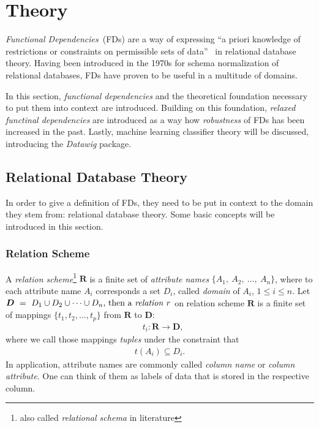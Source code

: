 \newpage
\section{Theory}
\emph{Functional Dependencies}~(FDs) are a way of expressing ``a priori knowledge of restrictions or constraints on permissible sets of data''~\cite[p.~42]{MAI83} in relational database theory.
Having been introduced in the 1970s for schema normalization of relational databases, FDs have proven to be useful in a multitude of domains.

In this section, \emph{functional dependencies} and the theoretical foundation necessary to put them into context are introduced.
Building on this foundation, \emph{relaxed functinal dependencies} are introduced as a way how \emph{robustness} of FDs has been increased in the past.
Lastly, machine learning classifier theory will be discussed, introducing the \emph{Datawig} package.

\subsection{Relational Database Theory}
In order to give a definition of FDs, they need to be put in context to the domain they stem from: relational database theory. Some basic concepts will be introduced in this section.

\subsubsection{Relation Scheme}
A \emph{relation scheme}\footnote{also called \emph{relational schema} in literature\cite[p.21]{ABE19} } \(\boldsymbol{R}\) is a finite set of \emph{attribute names} \(\{A_1,~A_2,~\dots,~A_n\}\), where to each attribute name \(A_i\) corresponds a set \(D_i\), called \emph{domain} of \(A_i\), \(1 \leq i \leq n\).
Let \(\boldsymbol{D}~=~D_1 \cup D_2 \cup \dots \cup D_n$, then a \emph{relation} \(r\) on relation scheme \(\boldsymbol{R}\) is a finite set of mappings \(\{t_1, t_2, \dots, t_p\}\) from \(\boldsymbol{R}\) to \(\boldsymbol{D}\):
\begin{align*}
  &t_i: \boldsymbol{R} \to \boldsymbol{D},
\end{align*}
where we call those mappings \emph{tuples} under the constraint that~\cite[p.2]{MAI83}
\begin{align*}
    t(A_i) \subseteq D_i.
\end{align*}
In application, attribute names are commonly called \emph{column name} or \emph{column attribute}.
One can think of them as labels of data that is stored in the respective column.


